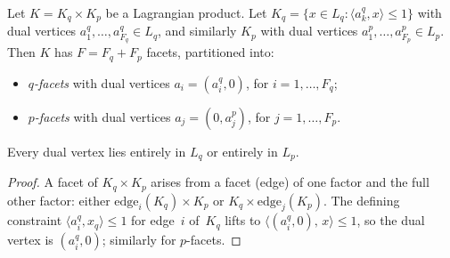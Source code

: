 
\begin{unverified}
\begin{lemma}\label{lem:lagrangian-facets}
Let $K = K_q \times K_p$ be a Lagrangian product.
Let $K_q = \{x \in L_q : \langle a_k^q, x \rangle \leq 1\}$
with dual vertices
$a_1^q, \ldots, a_{F_q}^q \in L_q$,
and similarly $K_p$ with dual vertices
$a_1^p, \ldots, a_{F_p}^p \in L_p$.
Then $K$ has $F = F_q + F_p$ facets, partitioned into:
\begin{itemize}
\item \emph{$q$-facets} with dual vertices $a_i = (a_i^q, 0)$,
  for $i = 1, \ldots, F_q$;
\item \emph{$p$-facets} with dual vertices $a_j = (0, a_j^p)$,
  for $j = 1, \ldots, F_p$.
\end{itemize}
Every dual vertex lies entirely in $L_q$ or entirely in $L_p$.
\end{lemma}

\begin{proof}
A facet of $K_q \times K_p$ arises from a facet (edge) of
one factor and the full other factor: either
$\text{edge}_i(K_q) \times K_p$ or $K_q \times \text{edge}_j(K_p)$.
The defining constraint $\langle a_i^q, x_q \rangle \leq 1$
for edge~$i$ of~$K_q$ lifts to
$\langle (a_i^q, 0),\, x \rangle \leq 1$,
so the dual vertex is $(a_i^q, 0)$;
similarly for $p$-facets.
\end{proof}
\end{unverified}


